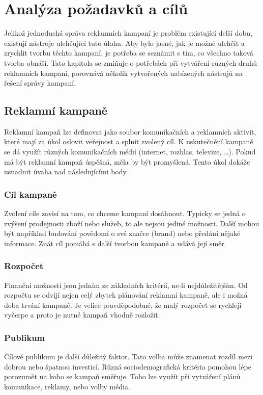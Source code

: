 \chapter{Analýza požadavků a cílů}
\label{chap:analysis}
Jelikož jednoduchá správa reklamních kampaní je problém existující delší dobu, existují nástroje ulehčující tuto úlohu. Aby bylo jasné, jak
je možné ulehčit a zrychlit tvorbu těchto kampaní, je potřeba se seznámit s tím, co všechno taková tvorba obnáší.
Tato kapitola se zmiňuje o potřebách při vytváření různých druhů reklamních kampaní, porovnává několik vytvořených nabízených
nástrojů na řešení správy kampaní.

\section{Reklamní kampaně}
Reklamní kampaň lze definovat jako soubor komunikačních a reklamních aktivit, které mají za úkol oslovit veřejnost a splnit zvolený cíl. K uskutečnění kampaně se dá využít různých komunikačních
médií (internet, rozhlas, televize, \ldots). Pokud má být reklamní kampaň úspěšná, měla by být promyšlená. Tento úkol dokáže usnadnit úvaha nad následujícími body.


\subsection{Cíl kampaně}
Zvolení cíle zavisí na tom, co chceme kampaní dosáhnout. Typicky se jedná o zvýšení prodejnosti zboží nebo služeb, to ale nejsou jediné možnosti. Další mohou být například budování
povědomí o své značce (brand) nebo předání nějaké informace. Znát cíl pomáhá s další tvorbou kampaně a udává její směr.

\subsection{Rozpočet}
Finanční možnosti jsou jedním ze základních kritérií, ne-li nejdůležitějším. Od rozpočtu se odvíjí nejen celý zbytek plánování reklamní kampaně, ale i možná
doba trvání kampaně. Je velice pravděpodobné, že malý rozpočet se rychleji vyčerpe a proto je nutné kampaň vhodně rozložit.

\subsection{Publikum}
Cílové publikum je další důležitý faktor. Tato volba může znamenat rozdíl mezi dobrou nebo špatnou investicí. Různá sociodemografická kritéria pomohou lépe porozumět
na koho se kampaň směřuje. Toho lze využít při vytváření plánů komunikace, reklamy, nebo volby média.

